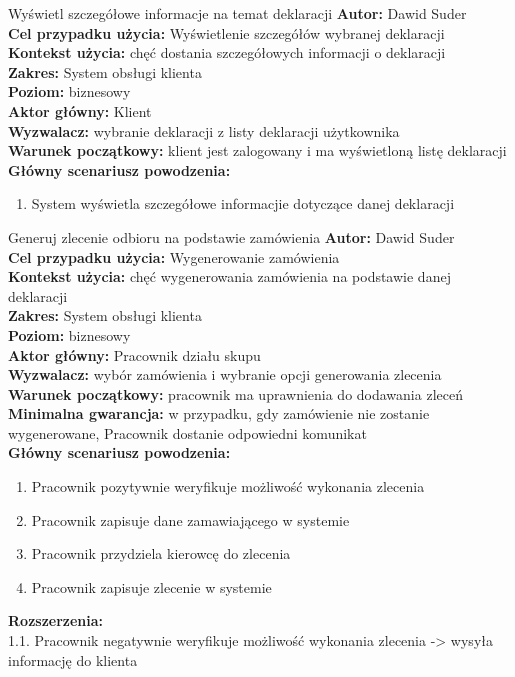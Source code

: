 \begin{usecase}{Wyświetl szczegółowe informacje na temat deklaracji}
	\textbf{Autor:} Dawid Suder \\
	\textbf{Cel przypadku użycia:} Wyświetlenie szczegółów wybranej deklaracji \\
	\textbf{Kontekst użycia:} chęć dostania szczegółowych informacji o deklaracji\\
	\textbf{Zakres:} System obsługi klienta \\
	\textbf{Poziom:} biznesowy \\
	\textbf{Aktor główny:} Klient\\
	\textbf{Wyzwalacz:} wybranie deklaracji z listy deklaracji użytkownika \\
	\textbf{Warunek początkowy:} klient jest zalogowany i ma wyświetloną listę deklaracji\\
	\textbf{Główny scenariusz powodzenia:} \\
		\begin{enumerate}
			\item System wyświetla szczegółowe informacjie dotyczące danej deklaracji
		\end{enumerate}
\end{usecase}

\begin{usecase}{Generuj zlecenie odbioru na podstawie zamówienia}
	\textbf{Autor:} Dawid Suder \\
	\textbf{Cel przypadku użycia:} Wygenerowanie zamówienia \\
	\textbf{Kontekst użycia:} chęć wygenerowania zamówienia na podstawie danej deklaracji\\
	\textbf{Zakres:} System obsługi klienta \\
	\textbf{Poziom:} biznesowy \\
	\textbf{Aktor główny:} Pracownik działu skupu\\
	\textbf{Wyzwalacz:} wybór zamówienia i wybranie opcji generowania zlecenia \\
	\textbf{Warunek początkowy:} pracownik ma uprawnienia do dodawania zleceń \\
	\textbf{Minimalna gwarancja:} w przypadku, gdy zamówienie nie zostanie wygenerowane, Pracownik dostanie odpowiedni komunikat \\
	\textbf{Główny scenariusz powodzenia:} \\
		\begin{enumerate}
			\item Pracownik pozytywnie weryfikuje możliwość wykonania zlecenia
			\item Pracownik zapisuje dane zamawiającego w systemie
			\item Pracownik przydziela kierowcę do zlecenia
			\item Pracownik zapisuje zlecenie w systemie
		\end{enumerate}
	\textbf{Rozszerzenia:} \\
			1.1. Pracownik negatywnie weryfikuje możliwość wykonania zlecenia -> wysyła informację do klienta
\end{usecase}

